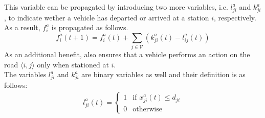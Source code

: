 This variable can be propagated by introducing two more variables, i.e. $l^a_{ji}$ and $k^a_{ji}$, to indicate wether a vehicle has departed or arrived at a station $i$, respectively. As a result, $f^a_i$ is propagated as follows.
\begin{equation}
		f^a_i(t+1) =f^a_i(t) + \sum_{j\in\mathcal{V}}(k^a_{ji}(t) - l_{ij}^a(t)) 
		\label{eq:stationed_propagation_ind}
\end{equation}
As an additional benefit,  also ensures that a vehicle performs an action on the road $\langle i,j\rangle$ only when stationed at $i$.\\
The variables $l^a_{ji}$ and $k^a_{ji}$ are binary variables as well and their definition is as follows:
\begin{align}
	l^a_{ji}(t) =\begin{cases}
		1 & \text{if }x^a_{ji}(t) \le d_{ji}\\
		0 & \text{otherwise}
	\end{cases}
	\label{eq:departed_variable}
\end{align}

